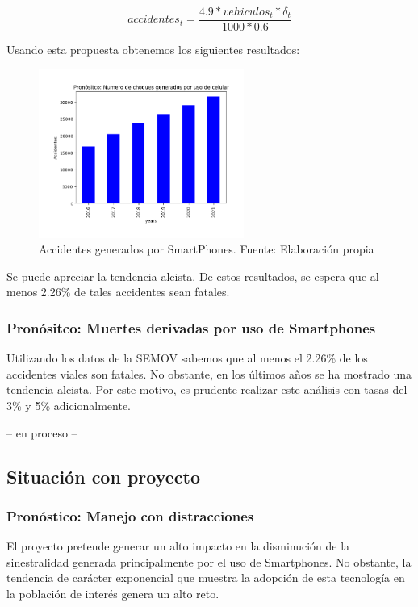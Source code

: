\documentclass{article}
\begin{document}
\begin{equation}
accidentes_{t} = \frac{4.9 * vehiculos_t * \delta_t}{1000 * 0.6}
\end{equation}

Usando esta propuesta obtenemos los siguientes resultados:

	\begin{figure}[H]\centering
	\includegraphics[width=0.6\textwidth]{resources/img/smart_accidents.png}
	\caption{\label{fig:smart_accidents} Accidentes generados por SmartPhones. Fuente: Elaboración propia}
    \end{figure}

Se puede apreciar la tendencia alcista. De estos resultados, se espera que al menos 2.26\% de tales accidentes sean
fatales.

\subsubsection{Pronósitco: Muertes derivadas por uso de Smartphones}

Utilizando los datos de la SEMOV sabemos que al menos el 2.26\% de los accidentes viales
son fatales. No obstante, en los últimos años se ha mostrado una tendencia alcista. Por 
este motivo, es prudente realizar este análisis con tasas del 3\% y 5\% adicionalmente.

-- en proceso --

\subsection{Situación con proyecto}

\subsubsection{Pronóstico: Manejo con distracciones}

El proyecto pretende generar un alto impacto en la disminución de la sinestralidad generada principalmente por el uso
de Smartphones. No obstante, la tendencia de carácter exponencial que muestra la adopción de esta tecnología en la
población de interés genera un alto reto.
\end{document}
